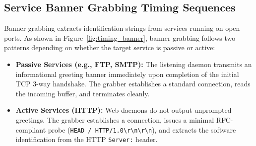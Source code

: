 \documentclass[11pt,a4paper]{article}
\begin{document}
\subsection{Service Banner Grabbing Timing Sequences}
Banner grabbing extracts identification strings from services running on open ports. As shown in Figure~\ref{fig:timing_banner}, banner grabbing follows two patterns depending on whether the target service is passive or active:
\begin{itemize}
    \item \textbf{Passive Services (e.g., FTP, SMTP):} The listening daemon transmits an informational greeting banner immediately upon completion of the initial TCP 3-way handshake. The grabber establishes a standard connection, reads the incoming buffer, and terminates cleanly.
    \item \textbf{Active Services (HTTP):} Web daemons do not output unprompted greetings. The grabber establishes a connection, issues a minimal RFC-compliant probe (\texttt{HEAD / HTTP/1.0\textbackslash r\textbackslash n\textbackslash r\textbackslash n}), and extracts the software identification from the HTTP \texttt{Server:} header.
\end{itemize}
\end{document}
